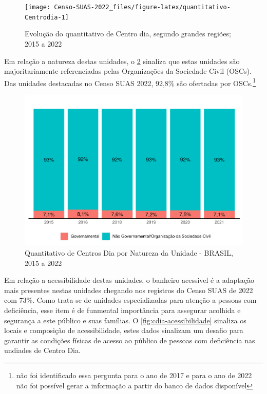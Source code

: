 \documentclass[
  brazilian]{report}
\begin{document}
\begin{figure}
\texttt{[image: Censo-SUAS-2022\_files/figure-latex/quantitativo-Centrodia-1]} \caption[Evolução do quantitativo de Centro dia, segundo grandes regiões]{Evolução do quantitativo de Centro dia, segundo grandes regiões; 2015 a 2022}\label{fig:quantitativo-Centrodia}
\end{figure}

Em relação a natureza destas unidades, o \cref{fig:cdia-natureza}
sinaliza que estas unidades são majoritariamente referenciadas pelas
Organizações da Sociedade Civil (OSCs). Das unidades destacadas no Censo
SUAS 2022, 92,8\% são ofertadas por
OSCs.\footnote{não foi identificado essa pergunta para o ano de 2017 e para o ano de 2022 não foi possível gerar a informação a partir do banco de dados disponível}

\begin{figure}
\includegraphics{Censo-SUAS-2022_files/figure-latex/cdia-natureza-1} \caption[Quantitativo de Centros Dia por Natureza da Unidade - BRASIL, 2015 a 2022]{Quantitativo de Centros Dia por Natureza da Unidade - BRASIL, 2015 a 2022}\label{fig:cdia-natureza}
\end{figure}

Em relação a acessibilidade destas unidades, o banheiro acessivel é a
adaptação mais presentes nestas unidades chegando nos registros do Censo
SUAS de 2022 com 73\%. Como trata-se de unidades especializadas para
atenção a pessoas com deficiência, esse item é de funmental importância
para assegurar acolhida e segurança a este público e suas famílias. O
\cref{fig:cdia-acessibilidade} sinaliza os locais e composição de
acessibilidade, estes dados sinalizam um desafio para garantir as
condições físicas de acesso ao público de pessoas com deficiência nas
undiades de Centro Dia.
\end{document}
